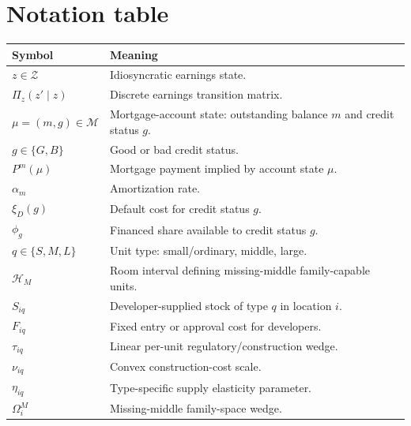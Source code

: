 \documentclass[11pt]{article}
\newcommand{\Zset}{\mathcal Z}
\newcommand{\Mset}{\mathcal M}
\newcommand{\Hset}{\mathcal H}
\begin{document}
\section*{Notation table}

\begin{longtable}{p{}p{}}
\toprule
Symbol & Meaning \\
\midrule
$z\in\Zset$ & Idiosyncratic earnings state. \\
$\Pi_z(z'\mid z)$ & Discrete earnings transition matrix. \\
$\mu=(m,g)\in\Mset$ & Mortgage-account state: outstanding balance $m$ and credit status $g$. \\
$g\in\{G,B\}$ & Good or bad credit status. \\
$P^m(\mu)$ & Mortgage payment implied by account state $\mu$. \\
$\alpha_m$ & Amortization rate. \\
$\xi_D(g)$ & Default cost for credit status $g$. \\
$\phi_g$ & Financed share available to credit status $g$. \\
$q\in\{S,M,L\}$ & Unit type: small/ordinary, middle, large. \\
$\Hset_M$ & Room interval defining missing-middle family-capable units. \\
$S_{iq}$ & Developer-supplied stock of type $q$ in location $i$. \\
$F_{iq}$ & Fixed entry or approval cost for developers. \\
$\tau_{iq}$ & Linear per-unit regulatory/construction wedge. \\
$\nu_{iq}$ & Convex construction-cost scale. \\
$\eta_{iq}$ & Type-specific supply elasticity parameter. \\
$\Omega_i^M$ & Missing-middle family-space wedge. \\
\bottomrule
\end{longtable}
\end{document}
